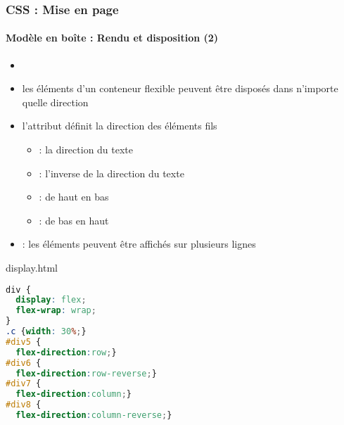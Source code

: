 \documentclass[xcolor=table]{beamer}
\begin{document}
\begin{frame}[fragile]
\frametitle{CSS : Mise en page}
\framesubtitle{Modèle en boîte : Rendu et disposition (2)}

\begin{minipage}{0.60\textwidth}
	\begin{itemize}
		\item {}
		\item les éléments d'un conteneur flexible peuvent être disposés dans n'importe quelle direction
		\item l'attribut  définit la direction des éléments fils
		\begin{itemize}
			\item {} : la direction du texte
			\item {} : l'inverse de la direction du texte
			\item {} : de haut en bas
			\item {} : de bas en haut
		\end{itemize}
	\item {} : les éléments peuvent être affichés sur plusieurs lignes 
	\end{itemize}
\end{minipage}
%
\begin{minipage}{0.38\textwidth}
\begin{exampleblock}{display.html}
\lstset{escapeinside=**}
\tiny\bfseries
\begin{lstlisting}[language={CSS}]
div {
  display: flex;
  flex-wrap: wrap;
}
.c {width: 30%;}
#div5 {
  flex-direction:row;}
#div6 {
  flex-direction:row-reverse;}
#div7 {
  flex-direction:column;}
#div8 {
  flex-direction:column-reverse;}
\end{lstlisting}
\end{exampleblock}
\end{minipage}
\end{frame}
\end{document}
